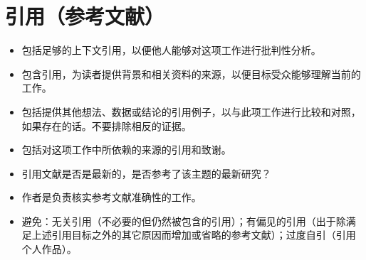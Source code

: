 \section*{引用（参考文献）}
\begin{itemize}
\item 包括足够的上下文引用，以便他人能够对这项工作进行批判性分析。
\item 包含引用，为读者提供背景和相关资料的来源，以便目标受众能够理解当前的工作。
\item 包括提供其他想法、数据或结论的引用例子，以与此项工作进行比较和对照，如果存在的话。不要排除相反的证据。
\item 包括对这项工作中所依赖的来源的引用和致谢。
\item 引用文献是否是最新的，是否参考了该主题的最新研究？
\item 作者是负责核实参考文献准确性的工作。
\item 避免：无关引用（不必要的但仍然被包含的引用）；有偏见的引用（出于除满足上述引用目标之外的其它原因而增加或省略的参考文献）；过度自引（引用个人作品）。
\end{itemize}

